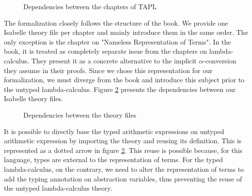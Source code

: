 \begin{figure}[h]
  \begin{center}
  \end{center}
  \caption{Dependencies between the chapters of TAPL}
  \label{fig:TAPL-dependencies}
\end{figure}

The formalization closely follows the structure of the book. We provide one Isabelle theory file per
chapter and mainly introduce them in the same order. The only exception is the chapter on "Nameless
Representation of Terms". In the book, it is treated as completely separate issue from the chapters
on lambda-calculus. They present it as a concrete alternative to the implicit $\alpha$-conversion
they assume in their proofs. Since we chose this representation for our formalization, we must
diverge from the book and introduce this subject prior to the untyped lambda-calculus. Figure
\ref{fig:thys-dependencies} presents the dependencies between our Isabelle theory files.

\begin{figure}[h]
  \begin{center}
  \end{center}
  \caption{Dependencies between the theory files}
  \label{fig:thys-dependencies}
\end{figure}

It is possible to directly base the typed arithmetic expressions on untyped arithmetic expression
by importing the theory and reusing its definition. This is represented as a dotted arrow in figure
\ref{fig:thys-dependencies}. This reuse is possible because, for this language, types are external
to the representation of terms. For the typed lambda-calculus, on the contrary, we need to alter the
representation of terms to add the typing annotation on abstraction variables, thus preventing the
reuse of the untyped lambda-calculus theory.
